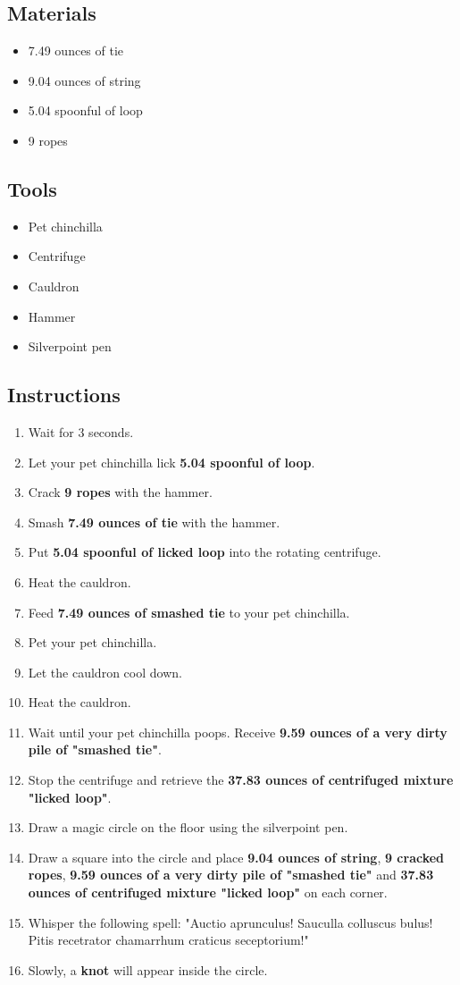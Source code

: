 \documentclass{article}
\begin{document}
\subsection{Materials}\begin{itemize}
\item 
7.49 ounces of tie
\item 
9.04 ounces of string
\item 
5.04 spoonful of loop
\item 
9 ropes
\end{itemize}
\subsection{Tools}\begin{itemize}
\item 
Pet chinchilla
\item 
Centrifuge
\item 
Cauldron
\item 
Hammer
\item 
Silverpoint pen
\end{itemize}
\subsection{Instructions}\begin{enumerate}
\item 
Wait for 3 seconds.
\item 
Let your pet chinchilla lick \textbf{5.04 spoonful of loop}.
\item 
Crack \textbf{9 ropes} with the hammer.
\item 
Smash \textbf{7.49 ounces of tie} with the hammer.
\item 
Put \textbf{5.04 spoonful of licked loop} into the rotating centrifuge.
\item 
Heat the cauldron.
\item 
Feed \textbf{7.49 ounces of smashed tie} to your pet chinchilla.
\item 
Pet your pet chinchilla.
\item 
Let the cauldron cool down.
\item 
Heat the cauldron.
\item 
Wait until your pet chinchilla poops. Receive \textbf{9.59 ounces of a very dirty pile of "smashed tie"}.
\item 
Stop the centrifuge and retrieve the \textbf{37.83 ounces of centrifuged mixture "licked loop"}.
\item 
Draw a magic circle on the floor using the silverpoint pen.
\item 
Draw a square into the circle and place \textbf{9.04 ounces of string}, \textbf{9 cracked ropes}, \textbf{9.59 ounces of a very dirty pile of "smashed tie"} and \textbf{37.83 ounces of centrifuged mixture "licked loop"} on each corner.
\item 
Whisper the following spell: "Auctio aprunculus! Sauculla colluscus bulus! Pitis recetrator chamarrhum craticus seceptorium!"
\item 
Slowly, a \textbf{knot} will appear inside the circle.
\end{enumerate}
\newpage
\end{document}
